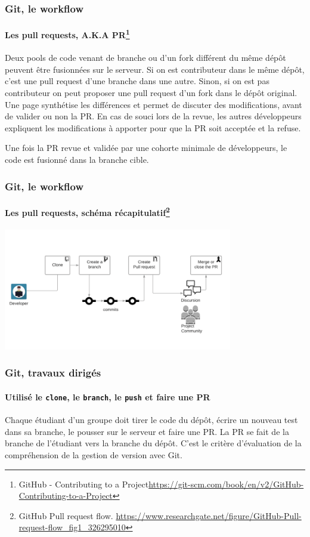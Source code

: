 \documentclass{beamer}
\begin{document}
    \begin{frame}
        \frametitle{Git, le workflow}
        \framesubtitle{Les pull requests, A.K.A PR\footnote{GitHub - Contributing to a Project\url{https://git-scm.com/book/en/v2/GitHub-Contributing-to-a-Project}}}
        \transdissolve
        Deux pools de code venant de branche ou d'un fork différent du même dépôt peuvent être fusionnées  sur le serveur.
        \bigbreak
        Si on est contributeur dans le même dépôt, c'est une pull request d'une branche dans une autre.
        Sinon, si on est pas contributeur on peut proposer une pull request d'un fork dans le dépôt original.
        \bigbreak
        Une page synthétise les différences et permet de discuter des modifications, avant de valider ou non la PR.
        \bigbreak
        En cas de souci lors de la revue, les autres développeurs expliquent les modifications à apporter pour que la PR soit acceptée et la refuse. 

        Une fois la PR revue et validée par une cohorte minimale de développeurs, le code est fusionné dans la branche cible. 
    \end{frame}

    \begin{frame}
        \frametitle{Git, le workflow}
        \framesubtitle{Les pull requests, schéma récapitulatif\footnote{GitHub Pull request flow. \url{https://www.researchgate.net/figure/GitHub-Pull-request-flow_fig1_326295010}}}
        \transdissolve
        \begin{center}
            \includegraphics[width=10cm]{image/github-pull-request-flow.png}
        \end{center}
    \end{frame}

    \begin{frame}
        \frametitle{Git, travaux dirigés}
        \framesubtitle{Utilisé le \lstinline{clone}, le \lstinline{branch}, le \lstinline{push} et faire une PR}
        \transdissolve
        Chaque étudiant d'un groupe doit tirer le code du dépôt, écrire un nouveau test dans sa branche, le pousser sur le serveur et faire une PR.
        \bigbreak
        La PR se fait de la branche de l'étudiant vers la branche  du dépôt.
        \bigbreak
        C'est le critère d'évaluation de la compréhension de la gestion de version avec Git.
    \end{frame}
\end{document}
